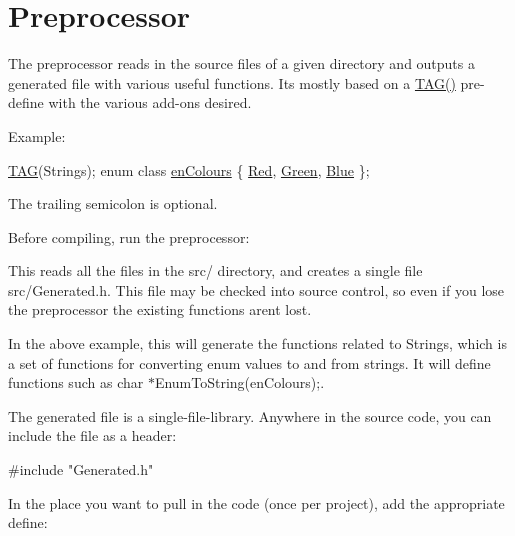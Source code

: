\section*{Preprocessor}

The preprocessor reads in the source files of a given directory and outputs a generated file with various useful functions. It\textquotesingle{}s mostly based on a \hyperlink{Generated__001_8h_ad9b15e5b6d9b1ed55b76d9916ff6dec2}{T\+A\+G()} pre-\/define with the various add-\/ons desired.

Example\+:


\begin{DoxyCode}
\hyperlink{Generated__001_8h_ad9b15e5b6d9b1ed55b76d9916ff6dec2}{TAG}(Strings);
\textcolor{keyword}{enum class} \hyperlink{PreprocTest_8h_a081cf1a0e70d6e2bd48c98f457742877}{enColours}
\{
    \hyperlink{PreprocTest_8h_a081cf1a0e70d6e2bd48c98f457742877aee38e4d5dd68c4e440825018d549cb47}{Red},
    \hyperlink{PreprocTest_8h_a081cf1a0e70d6e2bd48c98f457742877ad382816a3cbeed082c9e216e7392eed1}{Green},
    \hyperlink{PreprocTest_8h_a081cf1a0e70d6e2bd48c98f457742877a9594eec95be70e7b1710f730fdda33d9}{Blue}
\};
\end{DoxyCode}


The trailing semicolon is optional.

Before compiling, run the preprocessor\+:




This reads all the files in the {\ttfamily src/} directory, and creates a single file {\ttfamily src/\+Generated.\+h}. This file may be checked into source control, so even if you lose the preprocessor the existing functions aren\textquotesingle{}t lost.

In the above example, this will generate the functions related to \textquotesingle{}Strings\textquotesingle{}, which is a set of functions for converting enum values to and from strings. It will define functions such as {\ttfamily char $\ast$\+Enum\+To\+String(en\+Colours);}.

The generated file is a single-\/file-\/library. Anywhere in the source code, you can include the file as a header\+:


\begin{DoxyCode}
\textcolor{preprocessor}{#include "Generated.h"}
\end{DoxyCode}


In the place you want to pull in the code (once per project), add the appropriate define\+:


